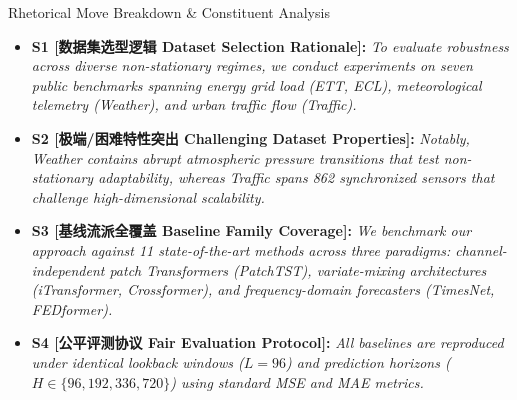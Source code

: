 \begin{TipBox}{Rhetorical Move Breakdown \& Constituent Analysis}
\begin{itemize}[leftmargin=1.5em]
  \item \textbf{S1 [数据集选型逻辑 Dataset Selection Rationale]:} \textit{To evaluate robustness across diverse non-stationary regimes, we conduct experiments on seven public benchmarks spanning energy grid load (ETT, ECL), meteorological telemetry (Weather), and urban traffic flow (Traffic).}\par{}
  \item \textbf{S2 [极端/困难特性突出 Challenging Dataset Properties]:} \textit{Notably, Weather contains abrupt atmospheric pressure transitions that test non-stationary adaptability, whereas Traffic spans 862 synchronized sensors that challenge high-dimensional scalability.}\par{}
  \item \textbf{S3 [基线流派全覆盖 Baseline Family Coverage]:} \textit{We benchmark our approach against 11 state-of-the-art methods across three paradigms: channel-independent patch Transformers (PatchTST), variate-mixing architectures (iTransformer, Crossformer), and frequency-domain forecasters (TimesNet, FEDformer).}\par{}
  \item \textbf{S4 [公平评测协议 Fair Evaluation Protocol]:} \textit{All baselines are reproduced under identical lookback windows ($L=96$) and prediction horizons ($H \in \{96, 192, 336, 720\}$) using standard MSE and MAE metrics.}\par{}
\end{itemize}
\end{TipBox}
\medskip
